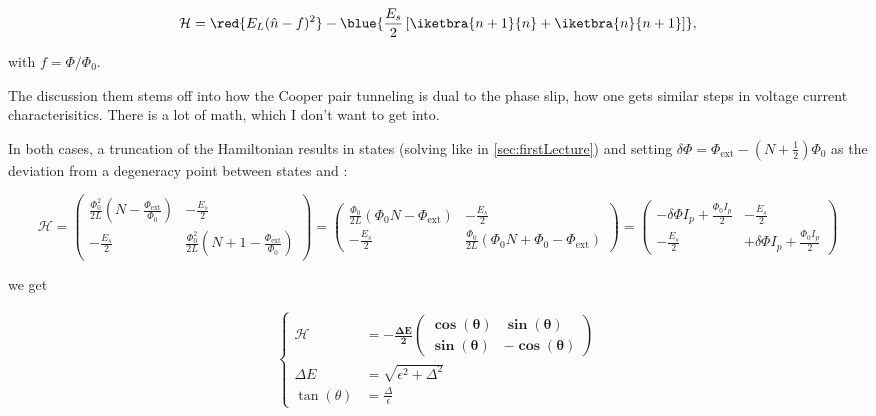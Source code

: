  \begin{equation}\label{eq:hamiltonian-cqps-standalone}
   \mathcal{H} = \red{E_L(\hat{n} - f)^2} - \blue{\frac{E_s}{2}\left[\iketbra{n+1}{n} + \iketbra{n}{n+1}\right]},
 \end{equation}

 \noindent with $ f = \Phi/\Phi_0 $.

 \begin{framed}\noindent
   \noindent The discussion them stems off into how the Cooper pair tunneling is
   dual  to the  phase  slip, how  one  gets similar  steps  in voltage  current
   characterisitics.  There is a lot of math, which I don't want to get into.
 \end{framed}

 In both cases, a truncation of  the Hamiltonian results in states (solving like
 in             \autoref{sec:firstLecture})              and             setting
 $\delta\Phi = \Phi_{\text{ext}}-  \left( N + \frac{1}{2}  \right)\Phi_0$ as the
 deviation from a degeneracy point between states  and :

 {\scriptsize \begin{equation} \mathcal{H} = \begin{pmatrix}
       \frac{\Phi_0^2}{2L}\left( N - \frac{\Phi_{\text{ext}}}{\Phi_0} \right) & -\frac{E_s}{2} \\
       -\frac{E_s}{2}     &     \frac{\Phi_0^2}{2L}\left(     N    +     1     -
         \frac{\Phi_{\text{ext}}}{\Phi_0} \right)
     \end{pmatrix} =
     \begin{pmatrix}
       \frac{\Phi_0}{2L}\left( \Phi_0N - \Phi_{\text{ext}}\right) & -\frac{E_s}{2} \\
       -\frac{E_s}{2}   &    \frac{\Phi_0}{2L}\left(   \Phi_0N   +    \Phi_0   -
         \Phi_{\text{ext}}\right)
     \end{pmatrix} =
     \begin{pmatrix}
       -\delta\Phi I_p  + \frac{\Phi_{0}I_p}{2}  & -\frac{E_s}{2} \\
       -\frac{E_s}{2} & +\delta\Phi I_p + \frac{\Phi_{0}I_p}{2}
     \end{pmatrix}
   \end{equation}}

 \noindent we get

 \begin{equation}
   \begin{aligned}
     \left\lbrace\begin{aligned}    \mathcal{H}   &    =   \mathbf{-\frac{\Delta
             E}{2}\begin{pmatrix}  \cos(\theta)  & \sin(\theta)\\\sin(\theta)  &
             -\cos(\theta)
           \end{pmatrix}}\\
         \Delta E & = \sqrt{\epsilon^2+\Delta^2}\\
         \tan(\theta) & = \frac{\Delta}{\epsilon}
       \end{aligned}\right.
   \end{aligned}
 \end{equation}

